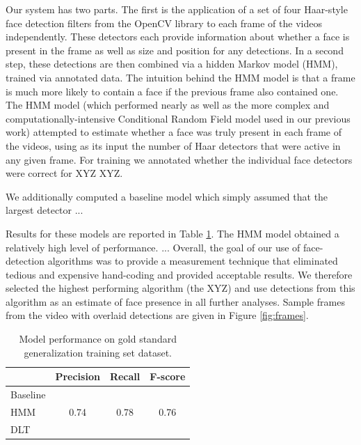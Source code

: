 \documentclass[10pt,letterpaper]{article}
\begin{document}
Our system has two parts. The first is the application of a set of four Haar-style face detection filters from the OpenCV library \cite{viola2004} to each frame of the videos independently. These detectors each provide information about whether a face is present in the frame as well as size and position for any detections. In a second step, these detections are then combined via a hidden Markov model (HMM), trained via annotated data. The intuition behind the HMM model is that a frame is much more likely to contain a face if the previous frame also contained one. The HMM model (which performed nearly as well as the more complex and computationally-intensive Conditional Random Field model used in our previous work) attempted to estimate whether a face was truly present in each frame of the videos, using as its input the number of Haar detectors that were active in any given frame. For training we annotated whether the individual face detectors were correct for XYZ XYZ. 

We additionally computed a baseline model which simply assumed that the largest detector ... 

Results for these models are reported in Table \ref{tab:results}. The HMM model obtained a relatively high level of performance.  ... Overall, the goal of our use of face-detection algorithms was to provide a measurement technique that eliminated tedious and expensive hand-coding and provided acceptable results. We therefore selected the highest performing algorithm (the XYZ) and use detections from this algorithm as an estimate of face presence in all further analyses. Sample frames from the video with overlaid detections are given in Figure \ref{fig:frames}.

\begin{table}[t]
  \caption{Model performance on gold standard generalization training set dataset. \label{tab:results} } 
  \begin{center} 
    \begin{tabular}{l|ccc} 
      \hline 
      \null & Precision & Recall & F-score  \\ 
      \hline 
      Baseline & & & \\
      HMM &        0.74  & 0.78 &    0.76   \\
      DLT & & & \\      
    \hline 
    \end{tabular} 
  \end{center}
\end{table}
\end{document}
